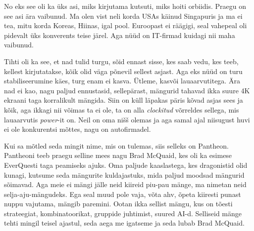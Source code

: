 No eks see oli ka üks asi, miks kirjutama kutsuti, miks hoiti orbiidis. Praegu on see asi ära vaibunud. Ma olen vist neli korda USAs käinud Singapuris ja ma ei tea, mitu korda Koreas, Hiinas, igal pool. Euroopast ei räägigi, seal vahepeal oli pidevalt üks konverents teise järel. Aga nüüd on  IT-firmad kuidagi nii maha vaibunud. 
                 

Tihti oli ka see, et nad tulid turgu, sõid ennast sisse, kes saab vedu, kes teeb, kellest kirjutatakse, kõik olid väga põnevil sellest asjast. Aga eks nüüd on turu stabiliseerumine  käes, turg enam ei kasva. Ütleme, kasvõi lauaarvutitega. Ära nad ei kao, nagu paljud ennustasid, sellepärast, mängurid tahavad ikka suure 4K ekraani taga korralikult mängida. Siin on küll läpakas päris kõvad asjas sees ja kõik, aga ikkagi nii võimas ta ei ole, ta on alla \emph{clockitud} võrreldes sellega, mis lauaarvutis \emph{power}-it on. Neil on oma nišš olemas ja aga samal ajal niisugust huvi ei ole konkurentsi mõttes, nagu on autofirmadel.
                 

Kui sa mõtled seda mingit nime, mis on tulemas, siis selleks on Pantheon. Pantheoni teeb praegu selline mees nagu Brad McQuaid, kes oli ka esimese EverQuesti taga peamiseks ajuks. Oma paljude kaaslastega, kes dragonistid olid kunagi, kutsume seda mängurite kuldajastuks, mida paljud moodsad mängurid sõimavad. Aga meie ei mängi jälle neid kiireid piu-pau mänge, ma nimetan neid selja-aju-mängudeks. Ega seal muud pole vaja, võta ahv, õpeta kiiresti punast nuppu vajutama, mängib paremini. Ootan ikka sellist mängu, kus on tõesti strateegiat, kombinatoorikat, gruppide juhtimist, suured AI-d. Selliseid mänge tehti mingil teisel ajastul, seda aega me igatseme ja seda lubab Brad McQuaid. 

